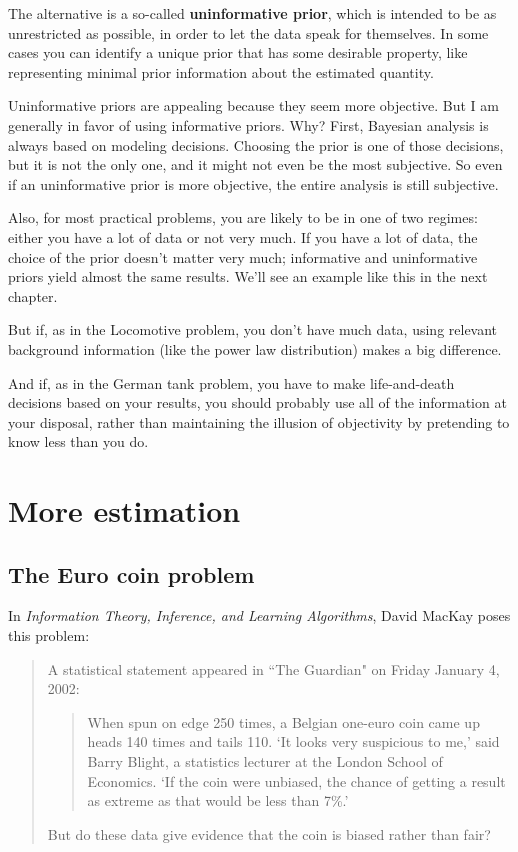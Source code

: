 \documentclass[12pt]{book}
\begin{document}
The alternative is a so-called {\bf uninformative prior}, which is
intended to be as unrestricted as possible, in order to let the data
speak for themselves.  In some cases you can identify a unique prior
that has some desirable property, like representing minimal prior
information about the estimated quantity.

Uninformative priors are appealing because they seem more
objective.  But I am generally in favor of using informative priors.
Why?  First, Bayesian analysis is always based on
modeling decisions.  Choosing the prior is one of those decisions, but
it is not the only one, and it might not even be the most subjective.
So even if an uninformative prior is more objective, the entire analysis
is still subjective.

Also, for most practical problems, you are likely to be in one of two
regimes: either you have a lot of data or not very much.  If you have
a lot of data, the choice of the prior doesn't matter very much;
informative and uninformative priors yield almost the same results.
We'll see an example like this in the next chapter.

But if, as in the Locomotive problem, you don't have much data,
using relevant background information (like the power law distribution)
makes a big difference.

And if, as in the German tank problem, you have to make life-and-death
decisions based on your results, you should probably use all of the
information at your disposal, rather than maintaining the illusion of
objectivity by pretending to know less than you do.


\chapter{More estimation}
\label{more}

\section{The Euro coin problem}
\label{euro}

In {\it Information Theory, Inference, and Learning Algorithms}, David MacKay
poses this problem:

\begin{quote}
A statistical statement appeared in ``The Guardian" on Friday January 4, 2002:

  \begin{quote}
        When spun on edge 250 times, a Belgian one-euro coin came
        up heads 140 times and tails 110.  `It looks very suspicious
        to me,' said Barry Blight, a statistics lecturer at the London
        School of Economics.  `If the coin were unbiased, the chance of
        getting a result as extreme as that would be less than 7\%.'
        \end{quote}

But do these data give evidence that the coin is biased rather than fair?
\end{quote}
\end{document}
